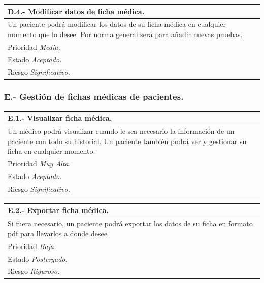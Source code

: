 \documentclass[a4paper,oneside,11pt]{book}
\begin{document}
\begin{center}
\begin{tabulary}{15cm}{|L|}
	\hline
		\bf{D.4.- Modificar datos de ficha médica.} \\
	\hline
		Un paciente podrá modificar los datos de su ficha médica en cualquier momento que lo desee. Por norma general será para añadir nuevas pruebas. \\
	\hline
		Prioridad \textit{Media.} \\
	\hline
		Estado \textit{Aceptado.} \\
	\hline
		Riesgo \textit{Significativo.} \\
	\hline
\end{tabulary}
\end{center}

\subsubsection{E.- Gestión de fichas médicas de pacientes.}

\begin{center}
\begin{tabulary}{15cm}{|L|}
	\hline
		\bf{E.1.- Visualizar ficha médica.} \\
	\hline
		Un médico podrá visualizar cuando le sea necesario la información de un paciente con todo su historial. Un paciente también podrá ver y gestionar su ficha en cualquier momento. \\
	\hline
		Prioridad \textit{Muy Alta.} \\
	\hline
		Estado \textit{Aceptado.} \\
	\hline
		Riesgo \textit{Significativo.} \\
	\hline
\end{tabulary}
\end{center}

\begin{center}
\begin{tabulary}{15cm}{|L|}
	\hline
		\bf{E.2.- Exportar ficha médica.} \\
	\hline
		Si fuera necesario, un paciente podrá exportar los datos de su ficha en formato pdf para llevarlos a donde desee. \\
	\hline
		Prioridad \textit{Baja.} \\
	\hline
		Estado \textit{Postergado.} \\
	\hline
		Riesgo \textit{Riguroso.} \\
	\hline
\end{tabulary}
\end{center}
\end{document}
